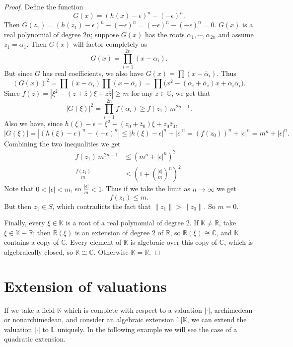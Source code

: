 \documentclass[11pt]{article}
\begin{document}
\begin{proof}
Define the function
\[
G(x) = (h(x) - \epsilon)^n - (-\epsilon)^n .
\]
Then $G(z_1) = (h(z_1) - \epsilon)^n - (-\epsilon)^n = (-\epsilon)^n - (-\epsilon)^n = 0$. $G(x)$ is a real polynomial of degree $2n$; suppose $G(x)$ has the roots $\alpha_1, \cdots, \alpha_{2n}$ and assume $z_1 = \alpha_1$. Then $G(x)$ will factor completely as
\[
G(x) = \prod_{i=1}^{2n} (x - \alpha_i) .
\]
But since $G$ has real coefficients, we also have $G(x) = \prod (x - \overline{\alpha}_i)$. Thus
\[
(G(x))^2 = \prod (x - \alpha_i) \prod (x - \overline{\alpha}_i) = \prod \big( x^2 - (\alpha_i + \overline{\alpha}_i)x + \alpha_i\overline{\alpha}_i \big) .
\]
Since $f(z) = |\xi^2 - (z + \overline{z})\xi + z\overline{z}| \geq m$ for any $z \in \mathbb{C}$, we get that
\[
|G(\xi)|^2 = \prod_{i=1}^{2n} f(\alpha_i) \geq f(z_1)\, m^{2n-1} .
\]
Also we have, since $h(\xi) - \epsilon = \xi^2 - (z_0 + \overline{z}_0)\xi + z_0\overline{z}_0$,
\[
|G(\xi)| = |(h(\xi) - \epsilon)^n - (-\epsilon)^n| \leq |h(\xi) - \epsilon|^n + |\epsilon|^n = (f(z_0))^n + |\epsilon|^n = m^n + |\epsilon|^n .
\]
Combining the two inequalities we get
\[
\begin{aligned}
f(z_1)\, m^{2n-1} &\leq \left( m^n + |\epsilon|^n \right)^2 \\
\frac{f(z_1)}{m} &\leq \left( 1 + \left( \frac{|\epsilon|}{m} \right)^n \right)^2 .
\end{aligned}
\]
Note that $0 < |\epsilon| < m$, so $\frac{|\epsilon|}{m} < 1$. Thus if we take the limit as $n \rightarrow \infty$ we get
\[
f(z_1) \leq m .
\]
But then $z_1 \in S$, which contradicts the fact that $\|z_1\| > \|z_0\|$. So $m = 0$.

Finally, every $\xi \in \mathbb{K}$ is a root of a real polynomial of degree $2$. If $\mathbb{K} \neq \mathbb{R}$, take $\xi \in \mathbb{K} - \mathbb{R}$; then $\mathbb{R}(\xi)$ is an extension of degree $2$ of $\mathbb{R}$, so $\mathbb{R}(\xi) \cong \mathbb{C}$, and $\mathbb{K}$ contains a copy of $\mathbb{C}$. Every element of $\mathbb{K}$ is algebraic over this copy of $\mathbb{C}$, which is algebraically closed, so $\mathbb{K} \cong \mathbb{C}$. Otherwise $\mathbb{K} = \mathbb{R}$.
\end{proof}

\section{Extension of valuations}

If we take a field $\mathbb{K}$ which is complete with respect to a valuation $|\cdot|$, archimedean or nonarchimedean, and consider an algebraic extension $\mathbb{L}|\mathbb{K}$, we can extend the valuation $|\cdot|$ to $\mathbb{L}$ uniquely. In the following example we will see the case of a quadratic extension.
\end{document}
